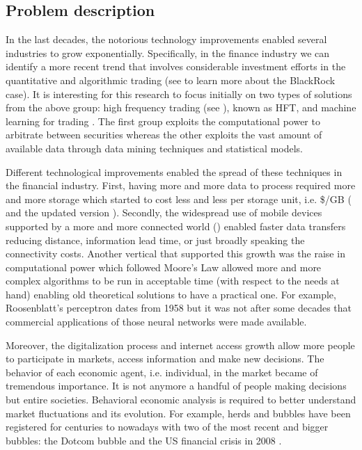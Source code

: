 \subsection{Problem description}
\label{sec:intro_problem_description}

In the last decades, the notorious technology improvements enabled several industries to grow exponentially. Specifically, in the finance industry we can identify a more recent trend that involves considerable investment efforts in the quantitative and algorithmic trading (see \cite{blackrock_investment} to learn more about the BlackRock case). It is interesting for this research to focus initially on two types of solutions from the above group: high frequency trading (see \cite{hft_intro}), known as HFT, and machine learning for trading \cite{machine_learning_in_finance}. The first group exploits the computational power to arbitrate between securities whereas the other exploits the vast amount of available data through data mining techniques and statistical models.

Different technological improvements enabled the spread of these techniques in the financial industry. First, having more and more data to process required more and more storage which started to cost less and less per storage unit, i.e. \$/GB (\cite{mkomo_cost_per_gb_updated} and the updated version \cite{mkomo_cost_per_gb_updated}). Secondly, the widespread use of mobile devices supported by a more and more connected world (\cite{itu_inet_access}) enabled faster data transfers reducing distance, information lead time, or just broadly speaking the connectivity costs. Another vertical that supported this growth was the raise in computational power which followed Moore's Law \cite{moore_law} allowed more and more complex algorithms to be run in acceptable time (with respect to the needs at hand) enabling old theoretical solutions to have a practical one. For example, Roosenblatt's perceptron dates from 1958 \cite{rosenblatt_perceptron} but it was not after some decades that commercial applications of  those neural networks were made available.

Moreover, the digitalization process and internet access growth \cite{owidinternet} allow more people to participate in markets, access information and make new decisions. The behavior of each economic agent, i.e. individual, in the market became of tremendous importance. It is not anymore a handful of people making decisions but entire societies. Behavioral economic analysis is required to better understand market fluctuations and its evolution. For example, herds and bubbles have been registered for centuries \cite{mackay} to nowadays with two of the most recent and bigger bubbles: the Dotcom bubble \cite{dot_com_bubble} and the US financial crisis in 2008 \cite{financial_crisis_2008}.

